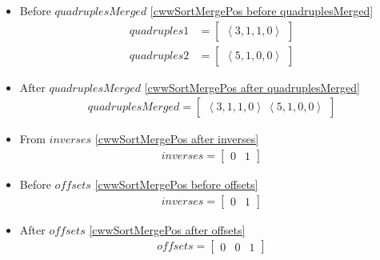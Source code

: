\begin{frame}[containsverbatim]{\cwwalgortihmexampleframe}
\begin{columns}[c]
\begin{column}{0.65\textwidth}
\begin{multicols}{2}
\begin{itemize}
                            \item Before $quadruplesMerged$ \cref{cwwSortMergePos before quadruplesMerged}
                            \begin{align*}
                                quadruples1 & = \begin{bmatrix}\left<3, 1, 1, 0\right>\end{bmatrix} \\
                                quadruples2 & = \begin{bmatrix}\left<5, 1, 0, 0\right>\end{bmatrix}
                            \end{align*}

                            \item After $quadruplesMerged$ \cref{cwwSortMergePos after quadruplesMerged}
                            \begin{align*}
                                quadruplesMerged = \begin{bmatrix}\left<3, 1, 1, 0\right> \ \left<5, 1, 0, 0\right>\end{bmatrix}
                            \end{align*}

                            \item From $inverses$ \cref{cwwSortMergePos after inverses}
                            \begin{align*}
                                inverses = \begin{bmatrix}0 & 1\end{bmatrix}
                            \end{align*}

                            \item Before $offsets$ \cref{cwwSortMergePos before offsets}
                            \begin{align*}
                                inverses = \begin{bmatrix}0 & 1\end{bmatrix}
                            \end{align*}

                            \item After $offsets$ \cref{cwwSortMergePos after offsets}
                            \begin{align*}
                                offsets = \begin{bmatrix}0 & 0 & 1\end{bmatrix}
                            \end{align*}


\end{itemize}
\end{multicols}
\end{column}
\end{columns}
\end{frame}
